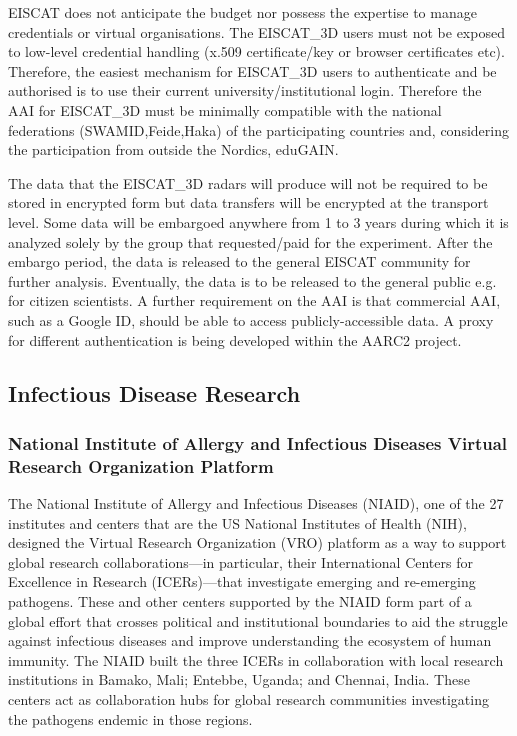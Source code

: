 \documentclass[fleqn,10pt]{wlscirep}
\begin{document}
{EISCAT does not anticipate the budget nor possess the expertise to manage credentials or virtual organisations. The EISCAT\_3D users must not be exposed to low-level credential handling (x.509 certificate/key or browser certificates etc). Therefore, the easiest mechanism for EISCAT\_3D users to authenticate and be authorised is to use their current  university/institutional login. Therefore the AAI for EISCAT\_3D must be minimally compatible with the national federations (SWAMID,Feide,Haka) of the participating countries and, considering the participation from outside the Nordics, eduGAIN.

The data that the EISCAT\_3D radars will produce will not be required to be stored in encrypted form but data transfers will be encrypted at the transport level. Some data will be embargoed anywhere from 1 to 3 years during which it is analyzed solely by the group that requested/paid for the experiment. After the embargo period, the data is released to the general EISCAT community for further analysis. Eventually, the data is to be released to the general public e.g. for citizen scientists. A further requirement on the AAI is that commercial AAI, such as a Google ID, should be able to access publicly-accessible data. A proxy for different authentication is being developed within the AARC2 project. 

\subsection{Infectious Disease Research}
\subsubsection{National Institute of Allergy and Infectious Diseases Virtual Research Organization Platform}
The National Institute of Allergy and Infectious Diseases (NIAID), one of the 27 institutes and centers that are the US National Institutes of Health (NIH), designed the Virtual Research Organization (VRO) platform as a way to support global research collaborations—in particular, their International Centers for Excellence in Research (ICERs)—that investigate emerging and re-emerging pathogens.  These and other centers supported by the NIAID form part of a global effort that crosses political and institutional boundaries to aid the struggle against infectious diseases and improve understanding the ecosystem of human immunity.  The NIAID built the three ICERs in collaboration with local research institutions in Bamako, Mali; Entebbe, Uganda; and Chennai, India.  These centers act as collaboration hubs for global research communities investigating the pathogens endemic in those regions.

}
\end{document}
